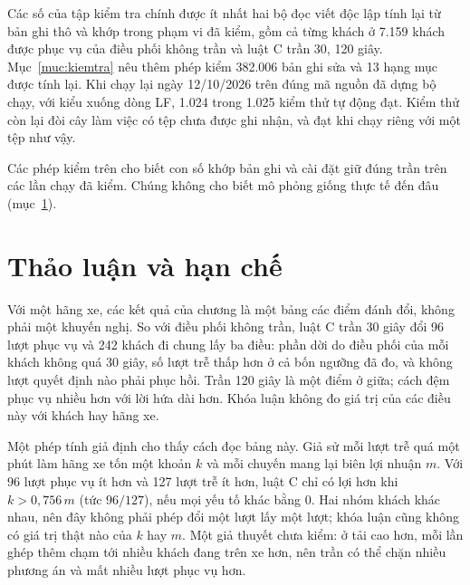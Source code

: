 Các số của tập kiểm tra chính được ít nhất hai bộ đọc viết độc lập tính lại từ bản ghi thô và khớp trong phạm vi đã
kiểm, gồm cả từng khách ở 7.159 khách được phục vụ của điều phối không trần và luật C trần 30, 120 giây. Mục~\ref{muc:kiemtra}
nêu thêm phép kiểm 382.006 bản ghi sửa và 13 hạng mục được tính lại. Khi chạy lại ngày 12/10/2026 trên đúng mã nguồn
đã dựng bộ chạy, với kiểu xuống dòng LF, 1.024 trong 1.025 kiểm thử tự động đạt. Kiểm thử còn lại đòi cây làm việc có
tệp chưa được ghi nhận, và đạt khi chạy riêng với một tệp như vậy.

Các phép kiểm trên cho biết con số khớp bản ghi và cài đặt giữ đúng trần trên các lần chạy đã kiểm. Chúng không cho
biết mô phỏng giống thực tế đến đâu (mục~\ref{muc:c4-thaoluan}).

\section{Thảo luận và hạn chế}
\label{muc:c4-thaoluan}

Với một hãng xe, các kết quả của chương là một bảng các điểm đánh đổi, không phải một khuyến nghị. So với điều phối
không trần, luật C trần 30 giây đổi 96 lượt phục vụ và 242 khách đi chung lấy ba điều: phần dời do điều phối của mỗi
khách không quá 30 giây, số lượt trễ thấp hơn ở cả bốn ngưỡng đã đo, và không lượt quyết định nào phải phục hồi. Trần
120 giây là một điểm ở giữa; cách đệm phục vụ nhiều hơn với lời hứa dài hơn. Khóa luận không đo giá trị của các điều
này với khách hay hãng xe.

Một phép tính giả định cho thấy cách đọc bảng này. Giả sử mỗi lượt trễ quá một phút làm hãng xe tốn một khoản $k$ và
mỗi chuyến mang lại biên lợi nhuận $m$. Với 96 lượt phục vụ ít hơn và 127 lượt trễ ít hơn, luật C chỉ có lợi hơn khi
$k > 0{,}756\,m$ (tức $96/127$), nếu mọi yếu tố khác bằng 0. Hai nhóm khách khác nhau, nên đây không phải phép đổi một
lượt lấy một lượt; khóa luận cũng không có giá trị thật nào của $k$ hay $m$. Một giả thuyết chưa kiểm: ở tải cao hơn,
mỗi lần ghép thêm chạm tới nhiều khách đang trên xe hơn, nên trần có thể chặn nhiều phương án và mất nhiều lượt phục
vụ hơn.

